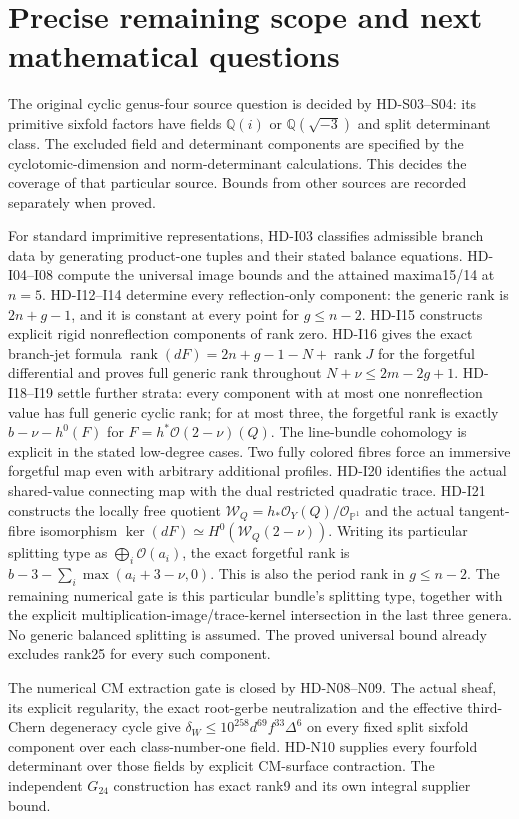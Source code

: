 \section{Precise remaining scope and next mathematical questions}

The original cyclic genus-four source question is decided by HD-S03--S04:
its primitive sixfold factors have fields $\mathbb Q(i)$ or
$\mathbb Q(\sqrt{-3})$ and split determinant class. The excluded field
and determinant components are specified by the cyclotomic-dimension
and norm-determinant calculations. This decides the coverage of that
particular source. Bounds from other sources are recorded separately
when proved.

For standard imprimitive representations, HD-I03 classifies admissible
branch data by generating product-one tuples and their stated balance
equations. HD-I04--I08 compute the universal image bounds and the
attained maxima15/14 at $n=5$. HD-I12--I14 determine every reflection-only
component: the generic rank is $2n+g-1$, and it is constant at every
point for $g\le n-2$. HD-I15 constructs explicit rigid nonreflection
components of rank zero. HD-I16 gives the exact branch-jet formula
$\operatorname{rank}(dF)=2n+g-1-N+\operatorname{rank}J$ for the
forgetful differential and proves full generic rank throughout
$N+\nu\le2m-2g+1$. HD-I18--I19 settle further strata: every component with at most one
nonreflection value has full generic cyclic rank; for at most three,
the forgetful rank is exactly $b-\nu-h^0(F)$ for
$F=h^*\mathcal O(2-\nu)(Q)$. The line-bundle cohomology is explicit
in the stated low-degree cases. Two fully colored fibres force an
immersive forgetful map even with arbitrary additional profiles.
HD-I20 identifies the actual shared-value connecting map with the dual
restricted quadratic trace. HD-I21 constructs the locally free quotient
$\mathcal W_Q=h_*\mathcal O_Y(Q)/\mathcal O_{\mathbb P^1}$ and the
actual tangent-fibre isomorphism
$\ker(dF)\simeq H^0(\mathcal W_Q(2-\nu))$.
Writing its particular splitting type as $\bigoplus_i\mathcal O(a_i)$,
the exact forgetful rank is
$b-3-\sum_i\max(a_i+3-\nu,0)$.
This is also the period rank in $g\le n-2$. The remaining numerical
gate is this particular bundle's splitting type, together with the
explicit multiplication-image/trace-kernel intersection in the last
three genera. No generic balanced splitting is assumed.
The proved universal bound
already excludes rank25 for every such component.

The numerical CM extraction gate is closed by HD-N08--N09.
The actual sheaf, its explicit regularity, the exact root-gerbe
neutralization and the effective third-Chern degeneracy cycle give
$\delta_W\le10^{258}d^{69}f^{33}\Delta^6$ on every fixed split
sixfold component over each class-number-one field. HD-N10 supplies
every fourfold determinant over those fields by explicit CM-surface
contraction. The independent $G_{24}$ construction has exact rank9
and its own integral supplier bound.

